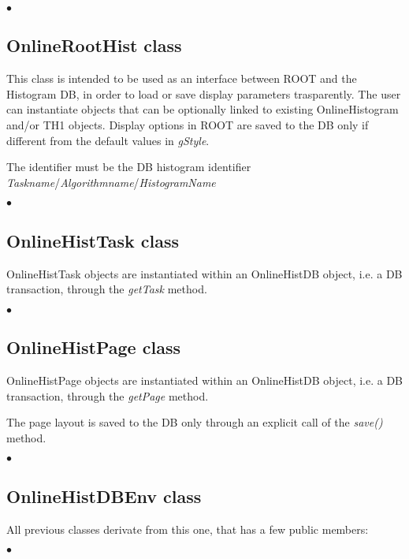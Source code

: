 \documentclass{lhcbnote}
\begin{document}
\begin{list}{$\bullet$}{}

\end{list}

\subsection{OnlineRootHist class}

This class is intended to be used as an interface between ROOT and the
Histogram DB, in
order to load or save display parameters trasparently.
 The user can instantiate objects that can be optionally 
linked to existing OnlineHistogram and/or TH1 objects.
Display options in ROOT are saved to the DB only if different from the
default values in {\it gStyle}.

The identifier must be the DB histogram identifier\\
{\it Taskname}/{\it Algorithmname}/{\it HistogramName}


\begin{list}{$\bullet$}{}

\end{list}


\subsection{OnlineHistTask class}

OnlineHistTask objects are instantiated within an
OnlineHistDB object, i.e. a DB transaction, through the {\it getTask} method.

\begin{list}{$\bullet$}{}

\end{list}


\subsection{OnlineHistPage class}

OnlineHistPage objects are instantiated within an
OnlineHistDB object, i.e. a DB transaction, through the {\it
getPage} method.

The page layout is saved to the DB only through an explicit call of
the {\it save()} method.

\begin{list}{$\bullet$}{}

\end{list}


\subsection{OnlineHistDBEnv class}\label{dbenvclass}
All previous classes derivate from this one, that has a few public
members:
\begin{list}{$\bullet$}{}

\end{list}
\end{document}
